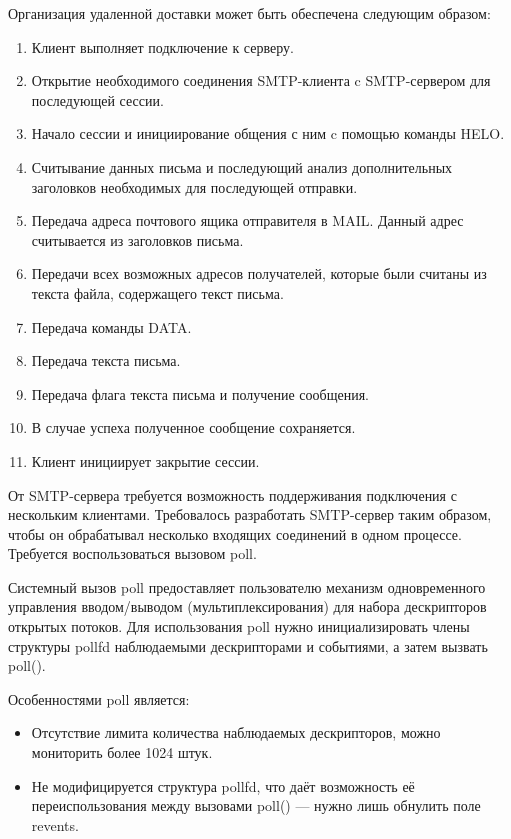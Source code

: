 \documentclass[a4paper,12pt]{report}
\begin{document}
	Организация удаленной доставки может быть обеспечена следующим образом:
	\begin{enumerate}
		\item Клиент выполняет подключение к серверу.
		\item Открытие необходимого соединения SMTP-клиента c SMTP-сервером для последующей сессии.
		\item Начало сессии и инициирование общения с ним c помощью команды HELO.
		\item Считывание данных письма и последующий анализ дополнительных заголовков необходимых для последующей отправки.
		\item Передача адреса почтового ящика отправителя в MAIL. Данный адрес считывается из заголовков письма.
		\item Передачи всех возможных адресов получателей, которые были считаны из текста файла, содержащего текст письма.
		\item Передача команды DATA.
		\item Передача текста письма.
		\item Передача флага текста письма и получение сообщения.
		\item В случае успеха полученное сообщение сохраняется.
		\item Клиент инициирует закрытие сессии.
	\end{enumerate}
	

	От SMTP-сервера требуется возможность поддерживания подключения с нескольким клиентами.
	Требовалось разработать SMTP-сервер таким образом,
	 чтобы он обрабатывал несколько входящих соединений в одном процессе. Требуется воспользоваться вызовом poll.

	 Системный вызов poll предоставляет пользователю механизм одновременного управления вводом/выводом (мультиплексирования) для набора дескрипторов открытых потоков. Для использования poll 
	 нужно инициализировать члены структуры pollfd наблюдаемыми дескрипторами и событиями, а затем вызвать poll().

	 Особенностями poll является:
	 \begin{itemize} 
		\item Отсутствие лимита количества наблюдаемых дескрипторов, можно мониторить более 1024 штук.
		\item Не модифицируется структура pollfd, что даёт возможность её переиспользования между вызовами poll()
	  — нужно лишь обнулить поле revents.
	\end{itemize}
\end{document}
